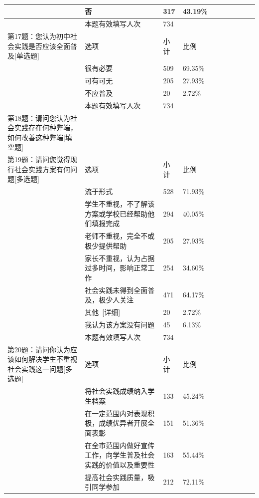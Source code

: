 \documentclass[12pt,UTF8]{ctexart}
\begin{document}
{\begin{spacing}{01}
\begin{longtable}{p{3.5cm}p{2cm}p{1.5cm}p{1.5cm}p{1.5cm}p{1.5cm}p{1.5cm}p{1cm}}
			~ & 否 & 317 & 43.19\% & ~ & ~ & ~ & ~ \\ \hline
			~ & 本题有效填写人次 & 734 & ~ & ~ & ~ & ~ & ~ \\ \hline
			第17题：您认为初中社会实践是否应该全面普及[单选题] & 选项 & 小计 & 比例 & ~ & ~ & ~ & ~ \\ \hline
			~ & 很有必要 & 509 & 69.35\% & ~ & ~ & ~ & ~ \\ \hline
			~ & 可有可无 & 205 & 27.93\% & ~ & ~ & ~ & ~ \\ \hline
			~ & 不应普及 & 20 & 2.72\% & ~ & ~ & ~ & ~ \\ \hline
			~ & 本题有效填写人次 & 734 & ~ & ~ & ~ & ~ & ~ \\ \hline
			第18题：请问您认为社会实践存在何种弊端，如何改善这种弊端[填空题] & ~ & ~ & ~ & ~ & ~ & ~ & ~ \\ \hline
			第19题：请问您觉得现行社会实践方案有何问题[多选题] & 选项 & 小计 & 比例 & ~ & ~ & ~ & ~ \\ \hline
			~ & 流于形式 & 528 & 71.93\% & ~ & ~ & ~ & ~ \\ \hline
			~ & 学生不重视，不了解该方案或学校已经帮助他们填报完成 & 294 & 40.05\% & ~ & ~ & ~ & ~ \\ \hline
			~ & 老师不重视，完全不或极少提供帮助 & 205 & 27.93\% & ~ & ~ & ~ & ~ \\ \hline
			~ & 家长不重视，认为占据过多时间，影响正常工作 & 254 & 34.60\% & ~ & ~ & ~ & ~ \\ \hline
			~ & 社会实践未得到全面普及，极少人关注 & 471 & 64.17\% & ~ & ~ & ~ & ~ \\ \hline
			~ & 其他 [详细] & 20 & 2.72\% & ~ & ~ & ~ & ~ \\ \hline
			~ & 我认为该方案没有问题 & 45 & 6.13\% & ~ & ~ & ~ & ~ \\ \hline
			~ & 本题有效填写人次 & 734 & ~ & ~ & ~ & ~ & ~ \\ \hline
			第20题：请问你认为应该如何解决学生不重视社会实践这一问题[多选题] & 选项 & 小计 & 比例 & ~ & ~ & ~ & ~ \\ \hline
			~ & 将社会实践成绩纳入学生档案 & 133 & 45.24\% & ~ & ~ & ~ & ~ \\ \hline
			~ & 在一定范围内对表现积极，成绩优异者开展全面表彰 & 151 & 51.36\% & ~ & ~ & ~ & ~ \\ \hline
			~ & 在全市范围内做好宣传工作，向学生普及社会实践的价值以及重要性 & 163 & 55.44\% & ~ & ~ & ~ & ~ \\ \hline
			~ & 提高社会实践质量，吸引同学参加 & 212 & 72.11\% & ~ & ~ & ~ & ~ \\ \hline

\end{longtable}
\end{spacing}}
\end{document}
